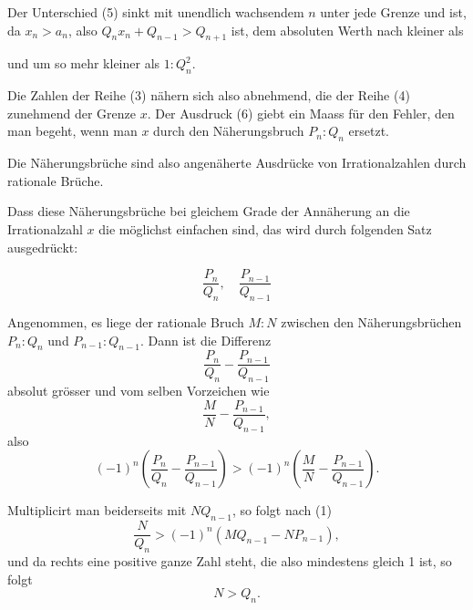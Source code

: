 
Der Unterschied (5) sinkt mit unendlich wachsendem $n$
unter jede Grenze und ist, da $x_n > a_n$, also $Q_n x_n + Q_{n-1} > Q_{n+1}$
ist, dem absoluten Werth nach kleiner als

und um so mehr kleiner als $1 : Q_n^2$.

Die Zahlen der Reihe (3) nähern sich also abnehmend, die
der Reihe (4) zunehmend der Grenze $x$. Der Ausdruck (6) giebt
ein Maass für den Fehler, den man begeht, wenn man $x$ durch
den Näherungsbruch $P_n : Q_n$ ersetzt.

Die Näherungsbrüche sind also angenäherte
Ausdrücke von Irrationalzahlen durch rationale
Brüche.

Dass diese Näherungsbrüche bei gleichem Grade der Annäherung
 an die Irrationalzahl $x$ die möglichst einfachen sind,
das wird durch folgenden Satz ausgedrückt:

\[
\frac{P_n}{Q_n}, \quad \frac{P_{n-1}}{Q_{n-1}}
\]

Angenommen, es liege der rationale Bruch $M : N$ zwischen
den Näherungsbrüchen $P_n : Q_n$ und $P_{n-1} : Q_{n-1}$. Dann ist die
Differenz
\[
\frac{P_n}{Q_n} - \frac{P_{n-1}}{Q_{n-1}}
\]
absolut grösser und vom selben Vorzeichen wie
\[
\frac{M}{N} - \frac{P_{n-1}}{Q_{n-1}},
\]
also
\[
(-1)^n \left(\frac{P_n}{Q_n} - \frac{P_{n-1}}{Q_{n-1}}\right) > (-1)^n \left(\frac{M}{N} - \frac{P_{n-1}}{Q_{n-1}}\right).
\]

Multiplicirt man beiderseits mit $N Q_{n-1}$, so folgt nach (1)
\[
\frac{N}{Q_n} > (-1)^n (M Q_{n-1} - N P_{n-1}),
\]
und da rechts eine positive ganze Zahl steht, die also mindestens
gleich 1 ist, so folgt
\[
N > Q_n.
\]

